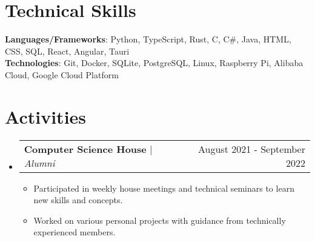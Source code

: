 \documentclass[letterpaper,11pt]{article}
\makeatletter
\newcommand{\resumeItem}[1]{
  \item\small{
    {#1 \vspace{-2pt}}
  }
}
\newcommand{\resumeProjectHeading}[2]{
    \item
    \begin{tabular*}{0.97\textwidth}{l@{\extracolsep{\fill}}r}
      \small#1 & #2 \\
    \end{tabular*}\vspace{-7pt}
}
\newcommand{\resumeSubHeadingListStart}{\begin{itemize}[leftmargin=0.15in, label={}]}
\newcommand{\resumeSubHeadingListEnd}{\end{itemize}}
\newcommand{\resumeItemListStart}{\begin{itemize}}
\newcommand{\resumeItemListEnd}{\end{itemize}\vspace{-5pt}}
\makeatother
\begin{document}
\section{Technical Skills}
 \begin{itemize}[leftmargin=0.15in, label={}]
    \small{\item{
     \textbf{Languages/Frameworks}{: Python, TypeScript, Rust, C, C\#, Java, HTML, CSS, SQL, React, Angular, Tauri} \\
     \textbf{Technologies}{: Git, Docker, SQLite, PostgreSQL, Linux, Raspberry Pi, Alibaba Cloud, Google Cloud Platform} \\
    }}
 \end{itemize}

 
\section{Activities}
    \resumeSubHeadingListStart
    \resumeProjectHeading
        {\textbf{Computer Science House} $|$ \textit{Alumni}}{August 2021 - September 2022}
        \resumeItemListStart
            \resumeItem {Participated in weekly house meetings and technical seminars to learn new skills and concepts.}
            \resumeItem {Worked on various personal projects with guidance from technically experienced members.}
        \resumeItemListEnd
    \resumeSubHeadingListEnd

\end{document}
